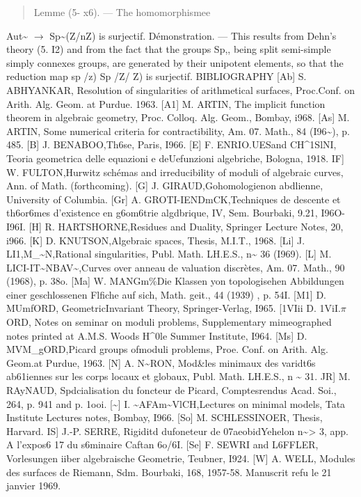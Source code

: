 \documentclass[11pt]{article}
\theoremstyle{plain}
\theoremstyle{definition}
\theoremstyle{remark}
\begin{document}
\begin{quote}Lemme (5- x6). --- The homomorphismee\end{quote}
Aut\textasciitilde{} $\to$ Sp\textasciitilde{}(Z/nZ) is surjectif. D\'emonstration. --- This results from Dehn's theory (5. I2) and from the fact that the groups Sp,, being split semi-simple simply connexes groups, are generated by their unipotent elements, so that the reduction map sp /z) Sp /Z/ Z) is surjectif. BIBLIOGRAPHY [Ab] S. ABHYANKAR, Resolution of singularities of arithmetical surfaces, Proc.Conf. on Arith. Alg. Geom. at Purdue. 1963. [A1] M. ARTIN, The implicit function theorem in algebraic geometry, Proc. Colloq. Alg. Geom., Bombay, i968. [As] M. ARTIN, Some numerical criteria for contractibility, Am. 07. Math., 84 (I96\textasciitilde{}), p. 485. [B] J. BENABOO,Th6se, Paris, I966. [E] F. ENRIO.UESand CH\textasciicircum{}1SlNI, Teoria geometrica delle equazioni e deUefunzioni algebriche, Bologna, 1918. IF] W. FULTON,Hurwitz sch\'emas and irreducibility of moduli of algebraic curves, Ann. of Math. (forthcoming). [G] J. GIRAUD,Gohomologienon abdlienne, University of Columbia. [Gr] A. GROTI-IENDmCK,Techniques de descente et th6or6mes d'existence en g6om6trie algdbrique, IV, Sem. Bourbaki, 9.21, I96O-I96I. [H] R. HARTSHORNE,Residues and Duality, Springer Lecture Notes, 20, i966. [K] D. KNUTSON,Algebraic spaces, Thesis, M.I.T., 1968. [Li] J. LI1,M\_\textasciitilde{}N,Rational singularities, Publ. Math. LH.E.S., n\textasciitilde{} 36 (I969). [L] M. LICI-IT\textasciitilde{}NBAV\textasciitilde{},Curves over anneau de valuation discr\`etes, Am. 07. Math., 90 (1968), p. 38o. [Ma] W. MANGm\%Die Klassen yon topologisehen Abbildungen einer geschlossenen Flfiche auf sich, Math. geit., 44 (1939) , p. 54I. [M1] D. MUmfORD, GeometricInvariant Theory, Springer-Verlag, I965. [1VIii D. 1ViI.$\pi$ORD, Notes on seminar on moduli problems, Supplementary mimeographed notes printed at A.M.S. Woods H\textasciicircum{}0le Summer Institute, I964. [Ms] D. MVM\_gORD,Picard groups ofmoduli problems, Proe. Conf. on Arith. Alg. Geom.at Purdue, 1963. [N] A. N\textasciitilde{}RON, Mod\&les minimaux des varidt6s ab61iennes sur les corps locaux et globaux, Publ. Math. LH.E.S., n \textasciitilde{} 31. JR] M. RAyNAUD, Spdcialisation du foncteur de Picard, Comptesrendus Acad. Soi., 264, p. 941 and p. 1ooi. [\textasciitilde{}] I. \textasciitilde{}AFAm\textasciitilde{}VlCH,Lectures on minimal models, Tata Institute Lectures notes, Bombay, I966. [So] M. SCHLESSINOER, Thesis, Harvard. IS] J.-P. SERRE, Rigiditd dufoneteur de 07aeobidYehelon n\textasciitilde{}> 3, app. A l'expos6 17 du s6minaire Caftan 6o/6I. [Se] F. SEWRI and L6FFLER, Vorlesungen iiber algebraische Geometrie, Teubner, I924. [W] A. WELL, Modules des surfaces de Riemann, Sdm. Bourbaki, 168, 1957-58. Manuscrit refu le 21 janvier 1969.
\end{document}
